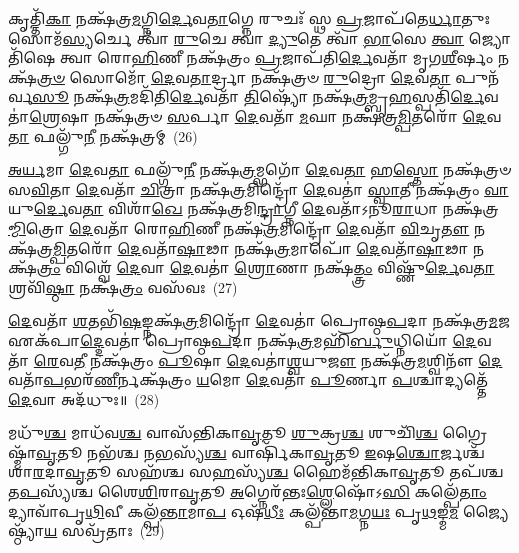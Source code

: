{\anuvakamend[{\-\ul{𑌰𑍁}\-𑌦𑍍𑌰 𑌏𑌕᳴𑌵𑌿𑍞𑌶𑌤𑌿𑌶𑍍𑌚}]}%

𑌕𑍃𑌤𑍍𑌤𑌿᳴\-\ul{𑌕𑌾} 𑌨𑌕𑍍𑌷᳴𑌤𑍍𑌰\-\ul{𑌮}\-𑌗𑍍𑌨𑌿\-\ul{𑌰𑍍𑌦𑍇}\-𑌵\-\ul{𑌤𑌾}\-𑌗𑍍𑌨𑍇 𑌰𑍁𑌚𑌃᳴ 𑌸𑍍𑌥 \ul{𑌪𑍍𑌰}\-𑌜𑌾𑌪᳴𑌤𑍇\-\ul{𑌰𑍍𑌧𑌾}\-𑌤𑍁𑌃 𑌸𑍋𑌮᳴\-\ul{𑌸𑍍𑌯}\-𑌰𑍍𑌚𑍇 𑌤𑍍𑌵𑌾᳴ \ul{𑌰𑍁}\-𑌚𑍇 𑌤𑍍𑌵𑌾॑ \ul{𑌦𑍍𑌯𑍁}\-𑌤𑍇 𑌤𑍍𑌵𑌾᳴ \ul{𑌭𑌾}\-𑌸𑍇 \ul{𑌤𑍍𑌵𑌾} 𑌜𑍍𑌯𑍋𑌤𑌿᳴𑌷𑍇 𑌤𑍍𑌵𑌾 𑌰𑍋\-\ul{𑌹𑌿}\-𑌣𑍀 𑌨𑌕𑍍𑌷᳴𑌤𑍍𑌰𑌂 \ul{𑌪𑍍𑌰}\-𑌜𑌾𑌪᳴𑌤𑌿\-\ul{𑌰𑍍𑌦𑍇}\-𑌵𑌤𑌾᳴ 𑌮𑍃𑌗\-\ul{𑌶𑍀}\-𑌰𑍍\mbox{}𑌷𑌂 𑌨𑌕𑍍𑌷᳴\-\ul{𑌤𑍍𑌰}\-\-\ul{𑍞} 𑌸𑍋𑌮𑍋᳴ \ul{𑌦𑍇}\-𑌵\-\ul{𑌤𑌾}\-𑌰𑍍𑌦𑍍𑌰𑌾 𑌨𑌕𑍍𑌷᳴𑌤𑍍𑌰𑍞 \ul{𑌰𑍁}\-𑌦𑍍𑌰𑍋 \ul{𑌦𑍇}\-𑌵\-\ul{𑌤𑌾} 𑌪𑍁𑌨᳴𑌰𑍍𑌵\-\ul{𑌸𑍂} 𑌨𑌕𑍍𑌷᳴\-\ul{𑌤𑍍𑌰}\-𑌮𑌦𑌿᳴𑌤𑌿\-\-\ul{𑌰𑍍𑌦𑍇}\-𑌵𑌤𑌾᳴ \ul{𑌤𑌿}\-𑌷𑍍𑌯𑍋᳴ 𑌨𑌕𑍍𑌷᳴\-\ul{𑌤𑍍𑌰}\-𑌮𑍍𑌬𑍃\-\ul{𑌹}\-𑌸𑍍𑌪𑌤𑌿᳴\-\ul{𑌰𑍍𑌦𑍇}\-𑌵𑌤𑌾॑\-\ul{𑌶𑍍𑌰𑍇}\-𑌷𑌾 𑌨𑌕𑍍𑌷᳴𑌤𑍍𑌰𑍞 \ul{𑌸}\-𑌰𑍍𑌪𑌾 \ul{𑌦𑍇}\-𑌵𑌤𑌾᳴ \ul{𑌮}\-𑌘𑌾 𑌨𑌕𑍍𑌷᳴𑌤𑍍𑌰\-\ul{𑌮𑍍𑌪𑌿}\-𑌤𑌰𑍋᳴ \ul{𑌦𑍇}\-𑌵\-\ul{𑌤𑌾} 𑌫𑌲𑍍𑌗𑍁᳴\-\ul{𑌨𑍀} 𑌨𑌕𑍍𑌷᳴𑌤𑍍𑌰𑌮𑍍~(26)

\-\ul{𑌅}\-\-\ul{𑌰𑍍𑌯}\-𑌮𑌾 \ul{𑌦𑍇}\-𑌵\-\ul{𑌤𑌾} 𑌫𑌲𑍍𑌗𑍁᳴\-\ul{𑌨𑍀} 𑌨𑌕𑍍𑌷᳴\-\ul{𑌤𑍍𑌰}\-𑌮𑍍𑌭𑌗𑍋᳴ \ul{𑌦𑍇}\-𑌵\-\ul{𑌤𑌾} 𑌹\-\ul{𑌸𑍍𑌤𑍋} 𑌨𑌕𑍍𑌷᳴𑌤𑍍𑌰𑍞 𑌸\-\ul{𑌵𑌿}\-𑌤𑌾 \ul{𑌦𑍇}\-𑌵𑌤𑌾᳴ \ul{𑌚𑌿}\-𑌤𑍍𑌰𑌾 𑌨𑌕𑍍𑌷᳴\-\ul{𑌤𑍍𑌰}\-𑌮𑌿𑌨𑍍𑌦𑍍𑌰𑍋᳴ \ul{𑌦𑍇}\-𑌵𑌤𑌾॑ \ul{𑌸𑍍𑌵𑌾}\-𑌤𑍀 𑌨𑌕𑍍𑌷᳴𑌤𑍍𑌰𑌂 \ul{𑌵𑌾}\-𑌯𑍁\-\ul{𑌰𑍍𑌦𑍇}\-𑌵\-\ul{𑌤𑌾} 𑌵𑌿𑌶𑌾᳴\-\ul{𑌖𑍇} 𑌨𑌕𑍍𑌷᳴𑌤𑍍𑌰𑌮𑌿\-\ul{𑌨𑍍𑌦𑍍𑌰𑌾}\-𑌗𑍍𑌨𑍀 \ul{𑌦𑍇}\-𑌵𑌤𑌾᳴\-𑌽𑌨𑍂\-\ul{𑌰𑌾}\-𑌧𑌾 𑌨𑌕𑍍𑌷᳴𑌤𑍍𑌰\-\ul{𑌮𑍍𑌮𑌿}\-𑌤𑍍𑌰𑍋 \ul{𑌦𑍇}\-𑌵𑌤𑌾᳴ 𑌰𑍋\-\ul{𑌹𑌿}\-𑌣𑍀 𑌨𑌕𑍍𑌷᳴\-\ul{𑌤𑍍𑌰}\-𑌮𑌿𑌨𑍍𑌦𑍍𑌰𑍋᳴ \ul{𑌦𑍇}\-𑌵𑌤𑌾᳴ \ul{𑌵𑌿}\-𑌚𑍃\-\ul{𑌤𑍗} 𑌨𑌕𑍍𑌷᳴𑌤𑍍𑌰\-\ul{𑌮𑍍𑌪𑌿}\-𑌤𑌰𑍋᳴ \ul{𑌦𑍇}\-𑌵𑌤𑌾᳴\-\ul{𑌷𑌾}\-𑌢𑌾 𑌨𑌕𑍍𑌷᳴\-\ul{𑌤𑍍𑌰}\-𑌮𑌾𑌪𑍋᳴ \ul{𑌦𑍇}\-𑌵𑌤𑌾᳴\-\ul{𑌷𑌾}\-𑌢𑌾 𑌨𑌕𑍍𑌷᳴\-\ul{𑌤𑍍𑌰𑌂} 𑌵𑌿𑌶𑍍𑌵𑍇᳴ \ul{𑌦𑍇}\-𑌵𑌾 \ul{𑌦𑍇}\-𑌵𑌤𑌾॑ \ul{𑌶𑍍𑌰𑍋}\-𑌣𑌾 𑌨𑌕𑍍𑌷᳴\-\ul{𑌤𑍍𑌤𑍍𑌰𑌂} 𑌵𑌿𑌷𑍍𑌣𑍁᳴\-\ul{𑌰𑍍𑌦𑍇}\-𑌵\-\ul{𑌤𑌾} 𑌶𑍍𑌰𑌵𑌿᳴\-\ul{𑌷𑍍𑌠𑌾} 𑌨𑌕𑍍𑌷᳴\-\ul{𑌤𑍍𑌰𑌂} 𑌵𑌸᳴𑌵𑌃~(27)

\-\ul{𑌦𑍇}\-𑌵𑌤𑌾᳴ \ul{𑌶}\-𑌤𑌭𑌿᳴\-\ul{𑌷}\-𑌙𑍍𑌨𑌕𑍍𑌷᳴\-\ul{𑌤𑍍𑌰}\-𑌮𑌿𑌨𑍍𑌦𑍍𑌰𑍋᳴ \ul{𑌦𑍇}\-𑌵𑌤𑌾॑ 𑌪𑍍𑌰𑍋𑌷𑍍𑌠\-\ul{𑌪}\-𑌦𑌾 𑌨𑌕𑍍𑌷᳴𑌤𑍍𑌰\-\ul{𑌮}\-𑌜 𑌏𑌕᳴𑌪𑌾\-\ul{𑌦𑍍𑌦𑍇}\-𑌵𑌤𑌾॑ 𑌪𑍍𑌰𑍋𑌷𑍍𑌠\-\ul{𑌪}\-𑌦𑌾 𑌨𑌕𑍍𑌷᳴\-\ul{𑌤𑍍𑌰}\-𑌮𑌹𑌿᳴\-\ul{𑌰𑍍𑌬𑍁}\-𑌧𑍍𑌨𑌿𑌯𑍋᳴ \ul{𑌦𑍇}\-𑌵𑌤𑌾᳴ \ul{𑌰𑍇}\-𑌵\-\ul{𑌤𑍀} 𑌨𑌕𑍍𑌷᳴𑌤𑍍𑌰𑌂 \ul{𑌪𑍂}\-𑌷𑌾 \ul{𑌦𑍇}\-𑌵𑌤𑌾॑\-\ul{𑌶𑍍𑌵}\-𑌯𑍁\-\ul{𑌜𑍗} 𑌨𑌕𑍍𑌷᳴𑌤𑍍𑌰\-\ul{𑌮}\-𑌶𑍍𑌵𑌿𑌨𑍗᳴ \ul{𑌦𑍇}\-𑌵𑌤𑌾᳴\-\ul{𑌪}\-𑌭𑌰᳴\-\ul{𑌣𑍀}\-𑌰𑍍𑌨𑌕𑍍𑌷᳴𑌤𑍍𑌰𑌂 \ul{𑌯}\-𑌮𑍋 \ul{𑌦𑍇}\-𑌵𑌤𑌾᳴ \ul{𑌪𑍂}\-𑌰𑍍𑌣𑌾 \ul{𑌪}\-𑌶𑍍𑌚𑌾𑌦𑍍𑌯𑌤𑍍𑌤𑍇᳴ \ul{𑌦𑍇}\-𑌵𑌾 𑌅𑌦᳴𑌧𑍁𑌃॥~(28)

{\anuvakamend[{𑌫𑌲𑍍𑌗𑍁᳴\-\ul{𑌨𑍀} 𑌨𑌕𑍍𑌷᳴\-\ul{𑌤𑍍𑌰𑌂} 𑌵𑌸᳴\-\ul{𑌵}\-𑌸𑍍𑌤𑍍𑌰𑌯᳴𑌸𑍍𑌤𑍍𑌰𑌿𑍞𑌶𑌚𑍍𑌚}]}%

𑌮𑌧𑍁᳴\-\ul{𑌶𑍍𑌚} 𑌮𑌾𑌧᳴𑌵\-\ul{𑌶𑍍𑌚} 𑌵𑌾𑌸᳴𑌨𑍍𑌤𑌿𑌕𑌾\-\ul{𑌵𑍃}\-𑌤𑍂 \ul{𑌶𑍁}\-𑌕𑍍𑌰\-\ul{𑌶𑍍𑌚} 𑌶𑍁𑌚𑌿᳴\-\ul{𑌶𑍍𑌚} 𑌗𑍍𑌰𑍈𑌷𑍍𑌮𑌾᳴\-\ul{𑌵𑍃}\-𑌤𑍂 𑌨𑌭᳴𑌶𑍍𑌚 𑌨\-\ul{𑌭}\-𑌸𑍍𑌯᳴\-\ul{𑌶𑍍𑌚} 𑌵𑌾𑌰𑍍\mbox{}𑌷𑌿᳴𑌕𑌾\-\ul{𑌵𑍃}\-𑌤𑍂 \ul{𑌇}\-𑌷\-\ul{𑌶𑍍𑌚𑍋}\-𑌰𑍍𑌜𑌶𑍍𑌚᳴ 𑌶𑌾\-\ul{𑌰}\-𑌦𑌾\-\ul{𑌵𑍃}\-𑌤𑍂 𑌸𑌹᳴𑌶𑍍𑌚 𑌸\-\ul{𑌹}\-𑌸𑍍𑌯᳴\-\ul{𑌶𑍍𑌚} 𑌹𑍈𑌮᳴𑌨𑍍𑌤𑌿𑌕𑌾\-\ul{𑌵𑍃}\-𑌤𑍂 𑌤𑌪᳴𑌶𑍍𑌚 𑌤\-\ul{𑌪}\-𑌸𑍍𑌯᳴𑌶𑍍𑌚 𑌶𑍈\-\ul{𑌶𑌿}\-𑌰𑌾\-\ul{𑌵𑍃}\-𑌤𑍂 \ul{𑌅}\-𑌗𑍍𑌨𑍇𑌰᳴𑌨𑍍𑌤𑌃\-\ul{𑌶𑍍𑌲𑍇}\-𑌷𑍋᳴\-𑌽\-\ul{𑌸𑌿} 𑌕𑌲𑍍𑌪𑍇᳴\-\ul{𑌤𑌾𑌂} 𑌦𑍍𑌯𑌾𑌵𑌾᳴𑌪𑍃\-\ul{𑌥𑌿}\-𑌵𑍀 𑌕𑌲𑍍𑌪᳴\-\ul{𑌨𑍍𑌤𑌾}\-𑌮𑌾\-\ul{𑌪} 𑌓𑌷᳴\-\ul{𑌧𑍀𑌃} 𑌕𑌲𑍍𑌪᳴𑌨𑍍𑌤𑌾\-\ul{𑌮}\-𑌗𑍍𑌨\-\ul{𑌯𑌃} 𑌪𑍃\-\ul{𑌥}\-𑌙𑍍𑌮\-\ul{𑌮} 𑌜𑍍𑌯𑍈𑌷𑍍𑌠𑍍𑌯𑌾᳴\-\ul{𑌯} 𑌸𑌵𑍍𑌰᳴𑌤𑌾𑌃~(29)

